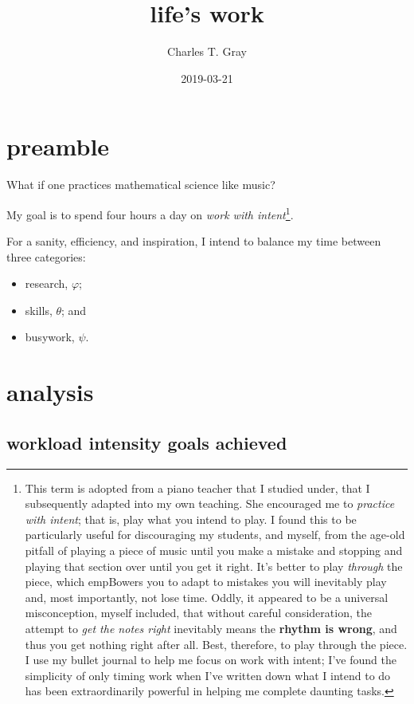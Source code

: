 \documentclass[]{book}
\title{life's work}
\author{Charles T. Gray}
\date{2019-03-21}
\providecommand{\tightlist}{%
  \setlength{\itemsep}{0pt}\setlength{\parskip}{0pt}}
\let\rmarkdownfootnote\footnote%
\def\footnote{\protect\rmarkdownfootnote}
\begin{document}
\maketitle

{
\setcounter{tocdepth}{1}
\tableofcontents
}
\hypertarget{preamble}{%
\chapter{preamble}\label{preamble}}

What if one practices mathematical science like music?

My goal is to spend four hours a day on \emph{work with intent}\footnote{This term is adopted from a piano teacher that I studied under, that I subsequently adapted into my own teaching. She encouraged me to \emph{practice with intent}; that is, play what you intend to play. I found this to be particularly useful for discouraging my students, and myself, from the age-old pitfall of playing a piece of music until you make a mistake and stopping and playing that section over until you get it right. It's better to play \emph{through} the piece, which empBowers you to adapt to mistakes you will inevitably play and, most importantly, not lose time. Oddly, it appeared to be a universal misconception, myself included, that without careful consideration, the attempt to \emph{get the notes right} inevitably means the \textbf{rhythm is wrong}, and thus you get nothing right after all. Best, therefore, to play through the piece. I use my bullet journal to help me focus on work with intent; I've found the simplicity of only timing work when I've written down what I intend to do has been extraordinarily powerful in helping me complete daunting tasks.}.

For a sanity, efficiency, and inspiration, I intend to balance my time between three categories:

\begin{itemize}
\tightlist
\item
  research, \(\varphi\);
\item
  skills, \(\theta\); and
\item
  busywork, \(\psi\).
\end{itemize}

\hypertarget{analysis}{%
\chapter{analysis}\label{analysis}}

\hypertarget{workload-intensity-goals-achieved}{%
\section{workload intensity goals achieved}\label{workload-intensity-goals-achieved}}
\end{document}
